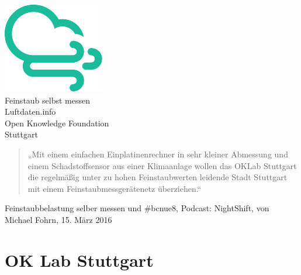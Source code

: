 \documentclass[
notumble,
]{leaflet}
\begin{document}
\color{LDGREEN}
\begin{center}
\includegraphics[width=\textwidth]{images/logo_luftdaten_info}
\\[2em]
\sffamily
\huge
Feinstaub selbst messen
\\[1em]
Luftdaten.info
\\[1em]
Open Knowledge Foundation 
\\
Stuttgart
\normalsize 
\normalfont
\end{center}
\color{black}

\newpage


\begin{quote}
„Mit einem einfachen Einplatinenrechner in sehr kleiner Abmessung und einem Schadstoffsensor aus einer Klimaanlage wollen das OKLab Stuttgart die regelmäßig unter zu hohen Feinstaubwerten leidende Stadt Stuttgart mit einem Feinstaubmessgerätenetz überziehen.“
\end{quote}
\raggedright{Feinstaubbelastung selber messen und \#bcnue8, Podcast: NightShift, von Michael Fohrn, 15. März 2016}


\section{OK Lab Stuttgart}
\end{document}
